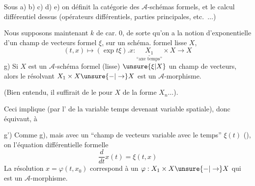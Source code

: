 
Sous a) b) c) d) e) on définit la catégorie des $\mathcal A$-schémas formels, et le calcul différentiel dessus (opérateurs différentiels, parties principales, etc.\ $\ldots$)

Nous supposons maintenant $k$ de car. $0$, de sorte qu'on a la notion d'exponentielle d'un champ de vecteurs formel $\xi$, sur  un schéma. formel lisse $X$,
\[
(t,x)\longmapsto(\exp t\xi).x:\underset{\text{``axe temps''}}{\underline{X_1}}\times X\longrightarrow X
\]
g) Si $X$ est un $\mathcal A$-schéma formel (lisse) $\unsure{\xi|X}$ un champ de vecteurs, alors le résolvant $X_1\times X\unsure{-|\to}X$ est un $\mathcal A$-morphisme.

(Bien entendu, il suffirait de le  pour $X$ de la forme $X_n\ldots$).

Ceci implique (par l' de la variable temps devenant variable spatiale), donc équivaut, à

g') Comme g), mais avec un ``champ de vecteurs variable avec le temps'' $\xi(t)$
(), on  l'équation différentielle formelle
\[
\frac{d}{dt}x(t)=\xi(t,x)
\]
La résolution $x=\varphi(t,x_0)$ correspond à un $\varphi:X_1\times X\unsure{-|\to}X$ qui est un $\mathcal A$-morphisme.

